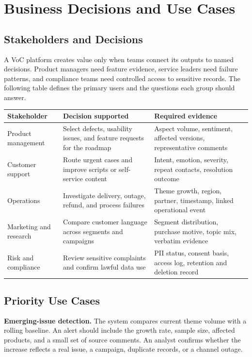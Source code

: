 \documentclass[11pt,a4paper,twoside]{article}
\begin{document}
\newpage

\section{Business Decisions and Use Cases}

\subsection{Stakeholders and Decisions}

A VoC platform creates value only when teams connect its outputs to named decisions. Product managers need feature evidence, service leaders need failure patterns, and compliance teams need controlled access to sensitive records. The following table defines the primary users and the questions each group should answer.

\begin{tabularx}{\textwidth}{|>{\raggedright\arraybackslash}p{3.05cm}|Y|Y|}
\hline
\textbf{Stakeholder} & \textbf{Decision supported} & \textbf{Required evidence} \\ \hline
Product management & Select defects, usability issues, and feature requests for the roadmap & Aspect volume, sentiment, affected versions, representative comments \\ \hline
Customer support & Route urgent cases and improve scripts or self-service content & Intent, emotion, severity, repeat contacts, resolution outcome \\ \hline
Operations & Investigate delivery, outage, refund, and process failures & Theme growth, region, partner, timestamp, linked operational event \\ \hline
Marketing and research & Compare customer language across segments and campaigns & Segment distribution, purchase motive, topic mix, verbatim evidence \\ \hline
Risk and compliance & Review sensitive complaints and confirm lawful data use & PII status, consent basis, access log, retention and deletion record \\ \hline
\end{tabularx}

\subsection{Priority Use Cases}

\textbf{Emerging-issue detection.} The system compares current theme volume with a rolling baseline. An alert should include the growth rate, sample size, affected products, and a small set of source comments. An analyst confirms whether the increase reflects a real issue, a campaign, duplicate records, or a channel outage.
\end{document}
